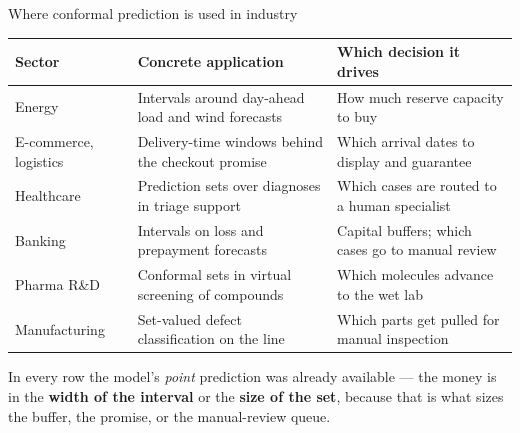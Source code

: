 \documentclass[aspectratio=169,11pt]{beamer}
\begin{document}
\begin{frame}{Where conformal prediction is used in industry}
  \scriptsize
  \begin{center}
  \begin{tabular}{@{}p{2.6cm}p{5.2cm}p{4.6cm}@{}}
    \toprule
    \textbf{Sector} & \textbf{Concrete application} & \textbf{Which decision it drives} \\
    \midrule
    Energy & Intervals around day-ahead load and wind forecasts & How much reserve
      capacity to buy \\
    E-commerce, logistics & Delivery-time windows behind the checkout promise &
      Which arrival dates to display and guarantee \\
    Healthcare & Prediction sets over diagnoses in triage support & Which cases are
      routed to a human specialist \\
    Banking & Intervals on loss and prepayment forecasts & Capital buffers; which cases
      go to manual review \\
    Pharma R\&D & Conformal sets in virtual screening of compounds & Which molecules
      advance to the wet lab \\
    Manufacturing & Set-valued defect classification on the line & Which parts get
      pulled for manual inspection \\
    \bottomrule
  \end{tabular}
  \end{center}
  \begin{industry}
    In every row the model's \emph{point} prediction was already available --- the money
    is in the \textbf{width of the interval} or the \textbf{size of the set}, because
    that is what sizes the buffer, the promise, or the manual-review queue.
  \end{industry}
\end{frame}
\end{document}

